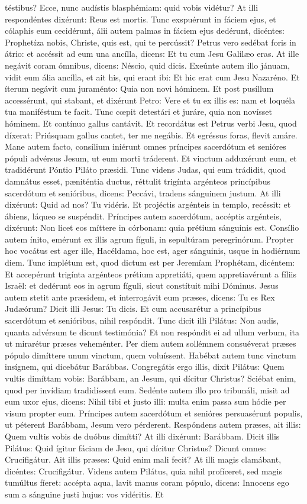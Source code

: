 {{téstibus? Ecce, nunc audístis blasphémiam: quid vobis vidétur? At illi respondéntes dixérunt: Reus est mortis. Tunc exspuérunt in fáciem ejus, et cólaphis eum cecidérunt, álii autem palmas in fáciem ejus dedérunt, dicéntes: Prophetíza nobis, Christe, quis est, qui te percússit? Petrus vero sedébat foris in átrio: et accéssit ad eum una ancílla, dicens: Et tu cum Jesu Galilæo eras. At ille negávit coram ómnibus, dicens: Néscio, quid dicis. Exeúnte autem illo jánuam, vidit eum ália ancílla, et ait his, qui erant ibi: Et hic erat cum Jesu Nazaréno. Et íterum negávit cum juraménto: Quia non novi hóminem. Et post pusíllum accessérunt, qui stabant, et dixérunt Petro: Vere et tu ex illis es: nam et loquéla tua maniféstum te facit. Tunc cœpit detestári et juráre, quia non novísset hóminem. Et contínuo gallus cantávit. Et recordátus est Petrus verbi Jesu, quod díxerat: Priúsquam gallus cantet, ter me negábis. Et egréssus foras, flevit amáre. Mane autem facto, consílium iniérunt omnes príncipes sacerdótum et senióres pópuli advérsus Jesum, ut eum morti tráderent. Et vinctum adduxérunt eum, et tradidérunt Póntio Piláto præsidi. Tunc videns Judas, qui eum trádidit, quod damnátus esset, pæniténtia ductus, réttulit trigínta argénteos princípibus sacerdótum et senióribus, dicens: Peccávi, tradens sánguinem justum. At illi dixérunt: Quid ad nos? Tu vidéris. Et projéctis argénteis in templo, recéssit: et ábiens, láqueo se suspéndit. Príncipes autem sacerdótum, accéptis argénteis, dixérunt: Non licet eos míttere in córbonam: quia prétium sánguinis est. Consílio autem ínito, emérunt ex illis agrum fíguli, in sepultúram peregrinórum. Propter hoc vocátus est ager ille, Hacéldama, hoc est, ager sánguinis, usque in hodiérnum diem. Tunc implétum est, quod dictum est per Jeremíam Prophétam, dicéntem: Et accepérunt trigínta argénteos prétium appretiáti, quem appretiavérunt a fíliis Israël: et dedérunt eos in agrum fíguli, sicut constítuit mihi Dóminus. Jesus autem stetit ante præsidem, et interrogávit eum præses, dicens: Tu es Rex Judæórum? Dicit illi Jesus: Tu dicis. Et cum accusarétur a princípibus sacerdótum et senióribus, nihil respóndit. Tunc dicit illi Pilátus: Non audis, quanta advérsum te dicunt testimónia? Et non respóndit ei ad ullum verbum, ita ut mirarétur præses veheménter. Per diem autem sollémnem consuéverat præses pópulo dimíttere unum vinctum, quem voluíssent. Habébat autem tunc vinctum insígnem, qui dicebátur Barábbas. Congregátis ergo illis, dixit Pilátus: Quem vultis dimíttam vobis: Barábbam, an Jesum, qui dícitur Christus? Sciébat enim, quod per invídiam tradidíssent eum. Sedénte autem illo pro tribunáli, misit ad eum uxor ejus, dicens: Nihil tibi et justo illi: multa enim passa sum hódie per visum propter eum. Príncipes autem sacerdótum et senióres persuasérunt populis, ut péterent Barábbam, Jesum vero pérderent. Respóndens autem præses, ait illis: Quem vultis vobis de duóbus dimítti? At illi dixérunt: Barábbam. Dicit illis Pilátus: Quid ígitur fáciam de Jesu, qui dícitur Christus? Dicunt omnes: Crucifigátur. Ait illis præses: Quid enim mali fecit? At illi magis clamábant, dicéntes: Crucifigátur. Videns autem Pilátus, quia nihil profíceret, sed magis tumúltus fíeret: accépta aqua, lavit manus coram pópulo, dicens: Innocens ego sum a sánguine justi hujus: vos vidéritis. Et }}
